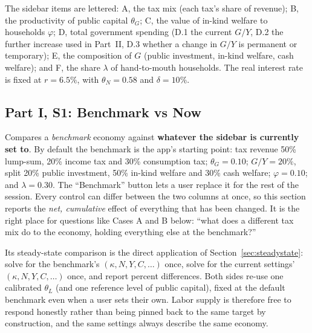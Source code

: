 \documentclass[11pt]{article}
\begin{document}
The sidebar items are lettered: A, the tax mix (each tax's share of
revenue); B, the productivity of public capital $\theta_G$; C, the value
of in-kind welfare to households $\varphi$; D, total government spending
(D.1 the current $G/Y$, D.2 the further increase used in Part~II, D.3
whether a change in $G/Y$ is permanent or temporary); E, the composition of
$G$ (public investment, in-kind welfare, cash welfare); and F, the share
$\lambda$ of hand-to-mouth households. The real interest rate is fixed at
$r=6.5\%$, with $\theta_N=0.58$ and $\delta=10\%$.

\subsection{Part I, S1: Benchmark vs Now}

Compares a \emph{benchmark} economy against \textbf{whatever the sidebar
is currently set to}. By default the benchmark is the app's starting
point: tax revenue 50\% lump-sum, 20\% income tax and 30\% consumption
tax; $\theta_G=0.10$; $G/Y=20\%$, split 20\% public investment, 50\%
in-kind welfare and 30\% cash welfare; $\varphi=0.10$; and $\lambda=0.30$.
The ``Benchmark'' button lets a user replace it for the rest of
the session. Every control can differ between the two columns at once, so
this section reports the \emph{net, cumulative} effect of everything that
has been changed. It is the right place for questions like Cases A and B
below: ``what does a different tax mix do to the economy, holding
everything else at the benchmark?''

Its steady-state comparison is the direct application of
Section~\ref{sec:steadystate}: solve for the benchmark's $(\kappa,N,Y,C,\ldots)$
once, solve for the current settings' $(\kappa,N,Y,C,\ldots)$ once, and
report percent differences. Both sides re-use one calibrated $\theta_L$
(and one reference level of public capital), fixed at the default
benchmark even when a user sets their own. Labor supply is therefore free
to respond honestly rather than being pinned back to the same target by
construction, and the same settings always describe the same economy.
\end{document}

